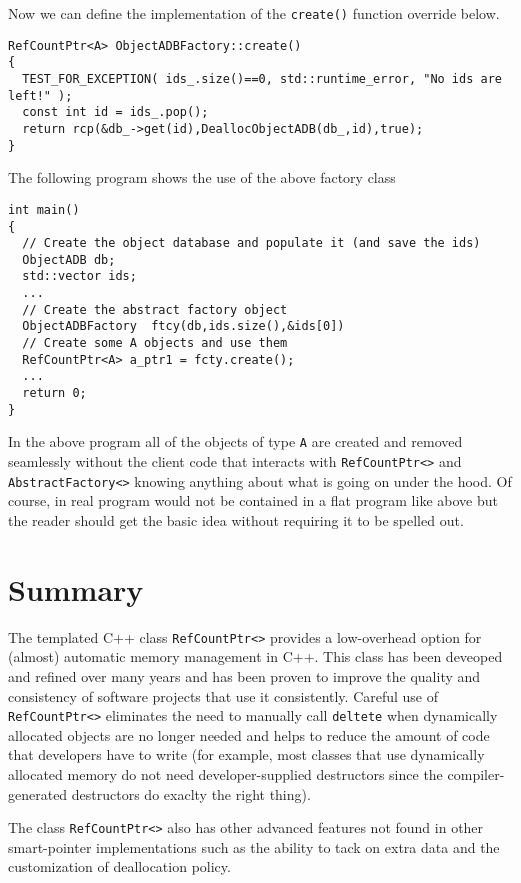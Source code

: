 Now we can define the implementation of the {}\texttt{create()} function
override below.
%
{\scriptsize\begin{verbatim}
RefCountPtr<A> ObjectADBFactory::create()
{
  TEST_FOR_EXCEPTION( ids_.size()==0, std::runtime_error, "No ids are left!" );
  const int id = ids_.pop();
  return rcp(&db_->get(id),DeallocObjectADB(db_,id),true);
}
\end{verbatim}}
%
The following program shows the use of the above factory class
%
{\scriptsize\begin{verbatim}
int main()
{
  // Create the object database and populate it (and save the ids)
  ObjectADB db;
  std::vector ids;
  ...
  // Create the abstract factory object
  ObjectADBFactory  ftcy(db,ids.size(),&ids[0])
  // Create some A objects and use them
  RefCountPtr<A> a_ptr1 = fcty.create();
  ...
  return 0;
}
\end{verbatim}}
%
In the above program all of the objects of type {}\texttt{A} are
created and removed seamlessly without the client code that interacts
with {}\texttt{RefCountPtr<>} and {}\texttt{AbstractFactory<>} knowing
anything about what is going on under the hood.  Of course, in real
program would not be contained in a flat program like above but the
reader should get the basic idea without requiring it to be spelled
out.

%
\section{Summary}
%

The templated C++ class {}\texttt{RefCountPtr<>} provides a
low-overhead option for (almost) automatic memory management in C++.
This class has been deveoped and refined over many years and has been
proven to improve the quality and consistency of software projects
that use it consistently.  Careful use of {}\texttt{RefCountPtr<>}
eliminates the need to manually call {}\texttt{deltete} when
dynamically allocated objects are no longer needed and helps to reduce
the amount of code that developers have to write (for example, most
classes that use dynamically allocated memory do not need
developer-supplied destructors since the compiler-generated
destructors do exaclty the right thing).

The class {}\texttt{RefCountPtr<>} also has other advanced features
not found in other smart-pointer implementations such as the ability
to tack on extra data and the customization of deallocation policy.
